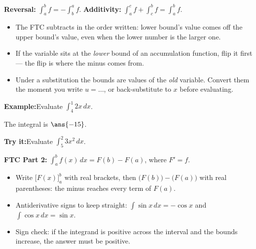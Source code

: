 \documentclass[12pt]{article}
\begin{document}


\begin{formulabox}
\textbf{Reversal:} $\displaystyle\int_a^b f = -\int_b^a f$. \qquad
\textbf{Additivity:} $\displaystyle\int_a^c f + \int_c^b f = \int_a^b f$.
\begin{itemize}[leftmargin=0.8cm, itemsep=1pt, topsep=2pt]
  \item The FTC subtracts in the order written: lower bound's value comes off the
        upper bound's value, even when the lower number is the larger one.
  \item If the variable sits at the \emph{lower} bound of an accumulation
        function, flip it first --- the flip is where the minus comes from.
  \item Under a substitution the bounds are values of the \emph{old} variable.
        Convert them the moment you write $u = \ldots$, or back-substitute to
        $x$ before evaluating.
\end{itemize}
\end{formulabox}

\begin{examplebox}
\textbf{Example:}\quad Evaluate $\displaystyle\int_{4}^{1} 2x\,dx$.

The integral is $\ans{-15}$.
\end{examplebox}

\begin{tryitbox}
\textbf{Try it:}\quad Evaluate $\displaystyle\int_{5}^{2} 3x^2\,dx$.\\[2pt]
\end{tryitbox}


\begin{formulabox}
\textbf{FTC Part 2:} $\displaystyle\int_a^b f(x)\,dx = F(b) - F(a)$, where
$F' = f$.
\begin{itemize}[leftmargin=0.8cm, itemsep=1pt, topsep=2pt]
  \item Write $\bigl[F(x)\bigr]_a^b$ with real brackets, then
        $\bigl(F(b)\bigr) - \bigl(F(a)\bigr)$ with real parentheses: the minus
        reaches every term of $F(a)$.
  \item Antiderivative signs to keep straight:
        $\int \sin x\,dx = -\cos x$ and $\int \cos x\,dx = \sin x$.
  \item Sign check: if the integrand is positive across the interval and the
        bounds increase, the answer must be positive.
\end{itemize}
\end{formulabox}
\end{document}
